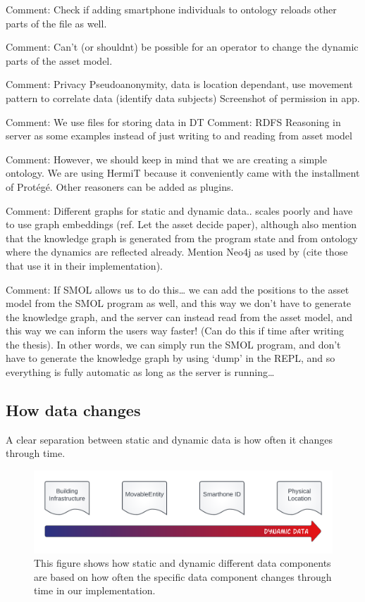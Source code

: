 \documentclass{article}
\begin{document}
Comment: Check if adding smartphone individuals to ontology reloads other parts of the file as well.

Comment: Can't (or shouldnt) be possible for an operator to change the dynamic parts of the asset model.

Comment: Privacy
    Pseudoanonymity, data is location dependant, use movement pattern to correlate data (identify data subjects) Screenshot of permission in app.

Comment: We use files for storing data in DT
Comment: RDFS Reasoning in server as some examples instead of just writing to and reading from asset model

Comment: However, we should keep in mind that we are creating a simple ontology. We are using HermiT because it conveniently came with the installment of Protégé. Other reasoners can be added as plugins.

Comment: Different graphs for static and dynamic data.. scales poorly and have to use graph embeddings (ref. Let the asset decide paper), although also mention that the knowledge graph is generated from the program state and from ontology where the dynamics are reflected already. Mention Neo4j as used by (cite those that use it in their implementation).

Comment: If SMOL allows us to do this… we can add the positions to the asset model from the SMOL program as well, and this way we don't have to generate the knowledge graph, and the server can instead read from the asset model, and this way we can inform the users way faster! (Can do this if time after writing the thesis). In other words, we can simply run the SMOL program, and don’t have to generate the knowledge graph by using ‘dump’ in the REPL, and so everything is fully automatic as long as the server is running…

\subsection{How data changes}
A clear separation between static and dynamic data is how often it changes through time. 

\begin{figure}
    \centering
    \includegraphics[scale=0.16]{graphics/dynamic_arrow.png}
    \caption{This figure shows how static and dynamic different data components are based on how often the specific data component changes through time in our implementation.}
    \label{fig:my_label}
\end{figure}
\end{document}
